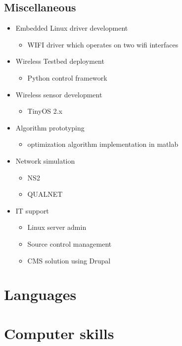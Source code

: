 \documentclass[11pt,a4paper,sans]{moderncv}        %
\begin{document}
\subsection{Miscellaneous}
\begin{itemize}%
\item Embedded Linux driver development
  \begin{itemize}%
  \item WIFI driver which operates on two wifi interfaces
  \end{itemize}
\item Wireless Testbed deployment
  \begin{itemize}%
  \item Python control framework
  \end{itemize}
\item Wireless sensor development
  \begin{itemize}%
  \item TinyOS 2.x
  \end{itemize}
\item Algorithm prototyping
  \begin{itemize}%
  \item optimization algorithm implementation in matlab
  \end{itemize}
\item Network simulation
  \begin{itemize}%
  \item NS2
  \item QUALNET
  \end{itemize}
\item IT support
  \begin{itemize}%
  \item Linux server admin
  \item Source control management
  \item CMS solution using Drupal
  \end{itemize}
\end{itemize}

\section{Languages}

\section{Computer skills}

\end{document}
